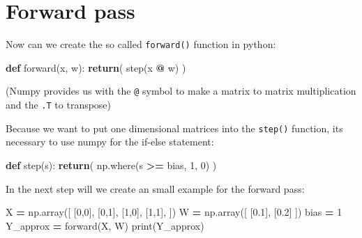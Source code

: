 \documentclass[
]{book}
\newenvironment{Shaded}{\begin{snugshade}}{\end{snugshade}}
\newcommand{\BuiltInTok}[1]{#1}
\newcommand{\ControlFlowTok}[1]{\textcolor[rgb]{0.13,0.29,0.53}{\textbf{#1}}}
\newcommand{\DecValTok}[1]{\textcolor[rgb]{0.00,0.00,0.81}{#1}}
\newcommand{\FloatTok}[1]{\textcolor[rgb]{0.00,0.00,0.81}{#1}}
\newcommand{\KeywordTok}[1]{\textcolor[rgb]{0.13,0.29,0.53}{\textbf{#1}}}
\newcommand{\NormalTok}[1]{#1}
\newcommand{\OperatorTok}[1]{\textcolor[rgb]{0.81,0.36,0.00}{\textbf{#1}}}
\begin{document}
\hypertarget{forward-pass}{%
\section{Forward pass}\label{forward-pass}}

Now can we create the so called \texttt{forward()} function in python:

\begin{Shaded}
\begin{Highlighting}[]
\KeywordTok{def}\NormalTok{ forward(x, w):}
  \ControlFlowTok{return}\NormalTok{( step(x }\OperatorTok{@}\NormalTok{ w) )}
\end{Highlighting}
\end{Shaded}

(Numpy provides us with the \texttt{@} symbol to make a matrix to matrix multiplication and the \texttt{.T} to transpose)

Because we want to put one dimensional matrices into the \texttt{step()} function, its necessary to use numpy for the if-else statement:

\begin{Shaded}
\begin{Highlighting}[]
\KeywordTok{def}\NormalTok{ step(s):}
  \ControlFlowTok{return}\NormalTok{( np.where(s }\OperatorTok{\textgreater{}=}\NormalTok{ bias, }\DecValTok{1}\NormalTok{, }\DecValTok{0}\NormalTok{) )}
\end{Highlighting}
\end{Shaded}

In the next step will we create an small example for the forward pass:

\begin{Shaded}
\begin{Highlighting}[]
\NormalTok{X }\OperatorTok{=}\NormalTok{ np.array([}
\NormalTok{  [}\DecValTok{0}\NormalTok{,}\DecValTok{0}\NormalTok{],}
\NormalTok{  [}\DecValTok{0}\NormalTok{,}\DecValTok{1}\NormalTok{],}
\NormalTok{  [}\DecValTok{1}\NormalTok{,}\DecValTok{0}\NormalTok{],}
\NormalTok{  [}\DecValTok{1}\NormalTok{,}\DecValTok{1}\NormalTok{],}
\NormalTok{])}
\NormalTok{W }\OperatorTok{=}\NormalTok{ np.array([}
\NormalTok{  [}\FloatTok{0.1}\NormalTok{], }
\NormalTok{  [}\FloatTok{0.2}\NormalTok{]}
\NormalTok{])}
\NormalTok{bias }\OperatorTok{=} \DecValTok{1}
\NormalTok{Y\_approx }\OperatorTok{=}\NormalTok{ forward(X, W)}
\BuiltInTok{print}\NormalTok{(Y\_approx)}
\end{Highlighting}
\end{Shaded}
\end{document}
